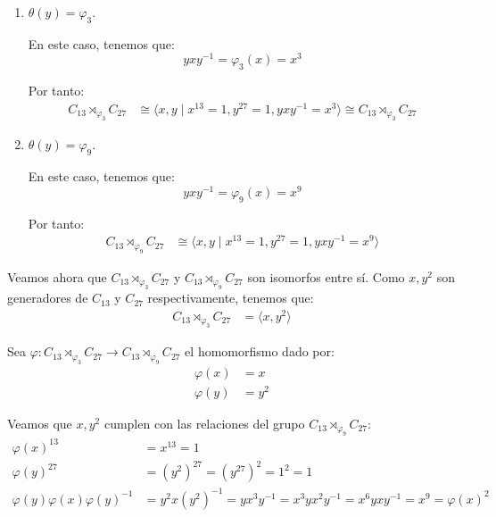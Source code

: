 \documentclass[12pt]{article}
\begin{document}
\begin{ejercicio}
\begin{enumerate}
\begin{enumerate}
                \item $\theta(y)=\varphi_3$.
                
                En este caso, tenemos que:
                \begin{equation*}
                    yxy^{-1} = \varphi_3(x) = x^3
                \end{equation*}

                Por tanto:
                \begin{align*}
                    C_{13} \rtimes_{\varphi_3} C_{27} &\cong \langle x,y\mid x^{13}=1, y^{27}=1, yxy^{-1}=x^3\rangle
                    \cong C_{13} \rtimes_{\varphi_3} C_{27}
                \end{align*}
                
                \item $\theta(y)=\varphi_9$.
                
                En este caso, tenemos que:
                \begin{equation*}
                    yxy^{-1} = \varphi_9(x) = x^9
                \end{equation*}

                Por tanto:
                \begin{align*}
                    C_{13} \rtimes_{\varphi_9} C_{27} &\cong \langle x,y\mid x^{13}=1, y^{27}=1, yxy^{-1}=x^9\rangle
                \end{align*}
            \end{enumerate}

            Veamos ahora que $C_{13} \rtimes_{\varphi_3} C_{27}$ y $C_{13} \rtimes_{\varphi_9} C_{27}$ son isomorfos entre sí. Como $x,y^2$ son generadores de $C_{13}$ y $C_{27}$ respectivamente, tenemos que:
            \begin{align*}
                C_{13} \rtimes_{\varphi_3} C_{27} & = \langle x,y^2\rangle
            \end{align*}

            Sea $\varphi:C_{13} \rtimes_{\varphi_3} C_{27} \to C_{13} \rtimes_{\varphi_9} C_{27}$ el homomorfismo dado por:
            \begin{align*}
                \varphi(x) & = x \\
                \varphi(y) & = y^2
            \end{align*}

            Veamos que $x,y^2$ cumplen con las relaciones del grupo $C_{13} \rtimes_{\varphi_9} C_{27}$:
            \begin{align*}
                \varphi(x)^{13} & = x^{13} = 1 \\
                \varphi(y)^{27} & = (y^2)^{27} = (y^{27})^2 = 1^2 = 1 \\
                \varphi(y)\varphi(x)\varphi(y)^{-1} & = y^2 x (y^2)^{-1} = yx^3y^{-1}
                = x^3yx^2y^{-1} = x^6yxy^{-1} = x^9 = \varphi(x)^2
            \end{align*}


\end{enumerate}
\end{ejercicio}
\end{document}
